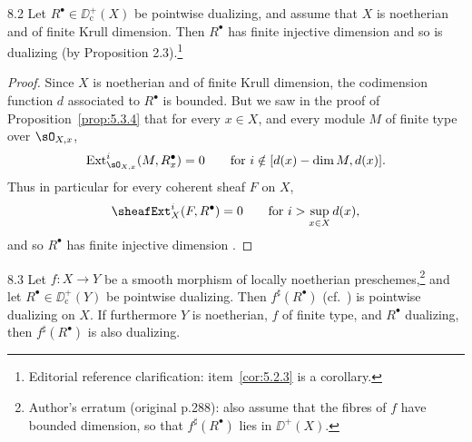 \begin{bookproposition}{8.2}\label{prop:5.8.2}
Let $R^\bullet\in\DD_{\mathrm{c}}^{+}(X)$ be pointwise dualizing, and assume that $X$ is noetherian and of finite Krull dimension. Then $R^\bullet$ has finite injective dimension and so is dualizing (by Proposition 2.3).\footnote{Editorial reference clarification: item~\ref{cor:5.2.3} is a corollary.}
\end{bookproposition}

\begin{proof}
Since $X$ is noetherian and of finite Krull dimension, the codimension function $d$ associated to $R^\bullet$ is bounded. But we saw in the proof of Proposition~\ref{prop:5.3.4} that for every $x\in X$, and every module $M$ of finite type over $\sO_{X,x}$,
\[
\operatorname{Ext}_{\sO_{X,x}}^{i}(M, R_{x}^{\bullet}) = 0 \qquad\text{for } i\notin[d(x)-\dim M, d(x)].
\]
Thus in particular for every coherent sheaf $F$ on $X$,
\[
\sheafExt_{X}^{i}(F,R^{\bullet}) = 0 \qquad\text{for } i > \sup_{x\in X} d(x),
\]
and so $R^\bullet$ has finite injective dimension .
\end{proof}

\begin{booktheorem}{8.3}\label{thm:5.8.3}
Let $f\colon X\to Y$ be a smooth morphism of locally noetherian preschemes,\footnote{Author's erratum (original p.288): also assume that the fibres of $f$ have bounded dimension, so that $f^\sharp(R^\bullet)$ lies in $\DD^+(X)$.} and let $R^{\bullet}\in\DD^{+}_{\mathrm{c}}(Y)$ be pointwise dualizing. Then $f^{\sharp}(R^{\bullet})$ (cf.\ ) is pointwise dualizing on $X$. If furthermore $Y$ is noetherian, $f$ of finite type, and $R^{\bullet}$ dualizing, then $f^{\sharp}(R^{\bullet})$ is also dualizing.
\end{booktheorem}

